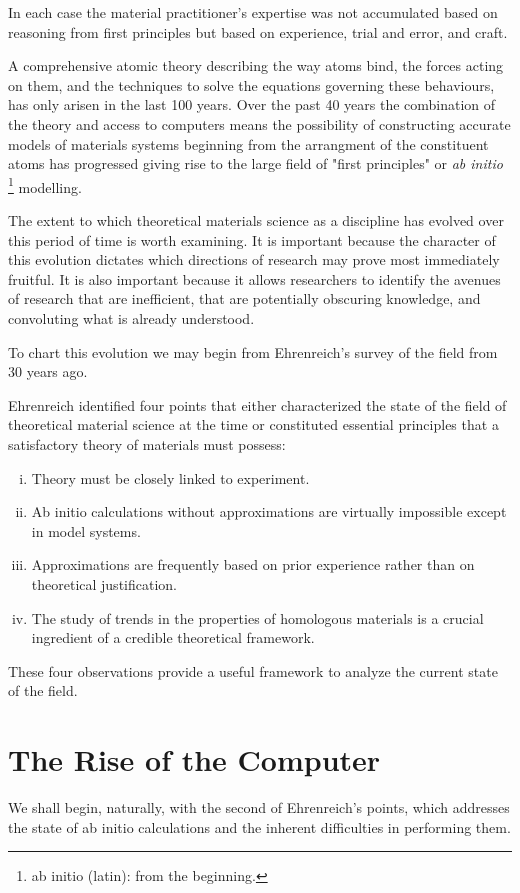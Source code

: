 In each case the material practitioner's expertise was not accumulated based on reasoning 
from first principles but based on experience, trial and error, and craft.

A comprehensive atomic theory describing the way atoms bind, the forces acting on them, 
and the techniques to solve the equations governing these behaviours, has only arisen in the last 100 years. 
Over the past 40 years the combination of the theory and access to computers 
means the possibility of constructing accurate models of materials 
systems beginning from the arrangment of the constituent atoms has
progressed giving rise to the large field of "first principles" or {\it ab initio}
\footnote{ab initio (latin): from the beginning.} modelling.

The extent to which theoretical materials science as a discipline has evolved 
over this period of time is worth examining. 
It is important because the character of this evolution dictates which 
directions of research may prove most immediately fruitful. It is also important 
because it allows researchers to identify the avenues
of research that are inefficient, that are potentially obscuring knowledge, 
and convoluting what is already understood. 

To chart this evolution we may begin from Ehrenreich's survey of the field from 30 years ago.

Ehrenreich identified four points that either characterized the state 
of the field of theoretical material science at the time or constituted essential principles 
that a satisfactory theory of materials must possess:
%
\begin{enumerate}[i)]
\item Theory must be closely linked to experiment.
\item Ab initio calculations without approximations are virtually impossible 
      except in model systems.
\item Approximations are frequently based on prior experience rather 
      than on theoretical justification.
\item The study of trends in the properties of homologous materials 
      is a crucial ingredient of a credible theoretical framework.
\end{enumerate}
%
These four observations provide a useful framework to analyze the current state of the field.

\section{The Rise of the Computer}
\label{sec:riseofcomp}
We shall begin, naturally, with the second of Ehrenreich's points, 
which addresses the state of ab initio calculations and 
the inherent difficulties in performing them. 

